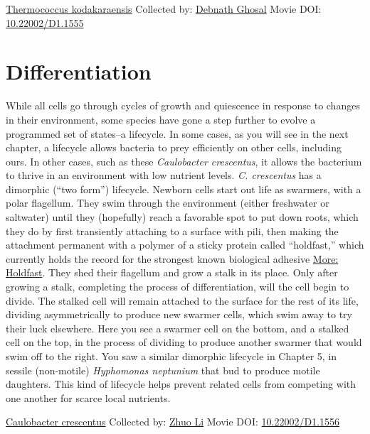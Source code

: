 \documentclass[]{tufte-book}
\begin{document}
\hypertarget{htmlwidget-866775aa25c2c9b25c9d}{}

\label{fig:8-3}\protect\hyperlink{tree}{Thermococcus kodakaraensis} Collected by: \protect\hyperlink{debnath_ghosal}{Debnath Ghosal} Movie DOI: \href{https://doi.org/10.22002/D1.1555}{10.22002/D1.1555}

\hypertarget{differentiation}{%
\section{Differentiation}\label{differentiation}}

While all cells go through cycles of growth and quiescence in response to changes in their environment, some species have gone a step further to evolve a programmed set of states--a lifecycle. In some cases, as you will see in the next chapter, a lifecycle allows bacteria to prey efficiently on other cells, including ours. In other cases, such as these \emph{Caulobacter crescentus}, it allows the bacterium to thrive in an environment with low nutrient levels. \emph{C. crescentus} has a dimorphic (``two form'') lifecycle. Newborn cells start out life as swarmers, with a polar flagellum. They swim through the environment (either freshwater or saltwater) until they (hopefully) reach a favorable spot to put down roots, which they do by first transiently attaching to a surface with pili, then making the attachment permanent with a polymer of a sticky protein called ``holdfast,'' which currently holds the record for the strongest known biological adhesive \protect\hyperlink{Holdfast}{More: Holdfast}. They shed their flagellum and grow a stalk in its place. Only after growing a stalk, completing the process of differentiation, will the cell begin to divide. The stalked cell will remain attached to the surface for the rest of its life, dividing asymmetrically to produce new swarmer cells, which swim away to try their luck elsewhere. Here you see a swarmer cell on the bottom, and a stalked cell on the top, in the process of dividing to produce another swarmer that would swim off to the right. You saw a similar dimorphic lifecycle in Chapter 5, in sessile (non-motile) \emph{Hyphomonas neptunium} that bud to produce motile daughters. This kind of lifecycle helps prevent related cells from competing with one another for scarce local nutrients.



\hypertarget{htmlwidget-c40118847afb9fdb174f}{}

\label{fig:8-4}\protect\hyperlink{tree}{Caulobacter crescentus} Collected by: \protect\hyperlink{zhuo_li}{Zhuo Li} Movie DOI: \href{https://doi.org/10.22002/D1.1556}{10.22002/D1.1556}
\end{document}
